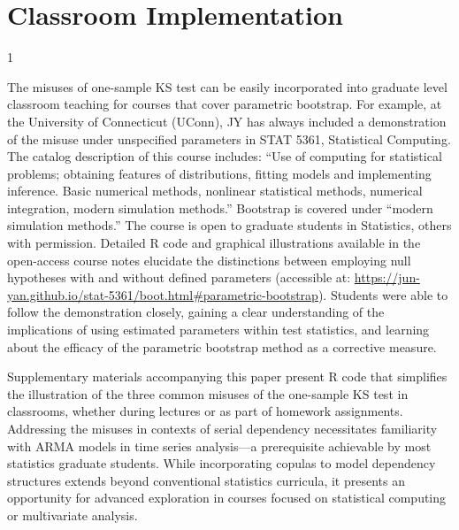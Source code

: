 \documentclass[12pt, letterpaper]{article}
\newcommand{\blind}{1}
\begin{document}
\section{Classroom Implementation}


\blind
{
The misuses of one-sample KS test can be easily incorporated into graduate level
classroom teaching for courses that cover parametric bootstrap. For example, at
the University of Connecticut (UConn), JY has always included a demonstration of
the misuse under unspecified parameters in STAT 5361, Statistical Computing. The
catalog description of this course includes: ``Use of computing for statistical
problems; obtaining features of distributions, fitting models and implementing
inference. Basic numerical methods, nonlinear statistical methods, numerical
integration, modern simulation methods.'' Bootstrap is covered under ``modern
simulation methods.''  The course is open to graduate students in Statistics,
others with permission. Detailed R code and graphical illustrations available in
the open-access course notes elucidate the distinctions between employing null
hypotheses with and without defined parameters (accessible at:
\url{https://jun-yan.github.io/stat-5361/boot.html#parametric-bootstrap}).
Students were able to follow the demonstration closely, gaining a clear
understanding of the implications of using estimated parameters within test
statistics, and learning about the efficacy of the parametric bootstrap method
as a corrective measure.


Supplementary materials accompanying this paper present R code that simplifies
the illustration of the three common misuses of the one-sample KS test in
classrooms, whether during lectures or as part of homework assignments.
Addressing the misuses in contexts of serial dependency necessitates familiarity
with ARMA models in time series analysis---a prerequisite achievable by most
statistics graduate students. While incorporating copulas to model dependency
structures extends beyond conventional statistics curricula, it presents an
opportunity for advanced exploration in courses focused on statistical computing
or multivariate analysis. 


}
\end{document}
